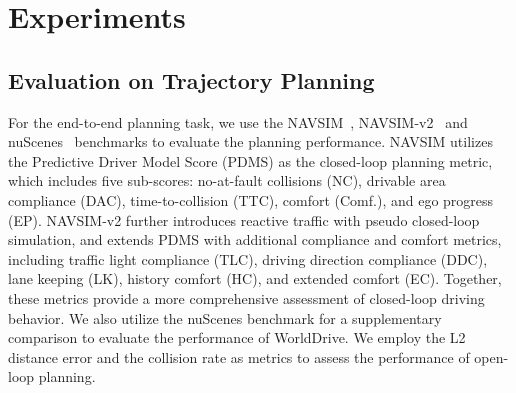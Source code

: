 \begin{table}[ht] 
        \centering
        
        \setlength{\tabcolsep}{6pt}
\caption{\textbf{nuScenes validation split open-loop planning comparison}.~We follow the SparseDrive evaluation metric. V: multi-view camera; SV: single-view camera}
\label{tab:openloop_turn}
\end{table}

\section{Experiments}


\subsection{Evaluation on Trajectory Planning}
For the end-to-end planning task, we use the NAVSIM~\cite{navsim}, NAVSIM-v2~\cite{cao2025pseudo} and nuScenes~\cite{nuscenes} benchmarks to evaluate the planning performance. NAVSIM utilizes the Predictive Driver Model Score (PDMS) as the closed-loop planning metric, which includes five sub-scores: no-at-fault collisions (NC), drivable area compliance (DAC), time-to-collision (TTC), comfort (Comf.), and ego progress (EP). NAVSIM-v2 further introduces reactive traffic with pseudo closed-loop simulation, and extends PDMS with additional compliance and comfort metrics, including traffic light compliance (TLC), driving direction compliance (DDC), lane keeping (LK), history comfort (HC), and extended comfort (EC). Together, these metrics provide a more comprehensive assessment of closed-loop driving behavior. We also utilize the nuScenes benchmark for a supplementary comparison to evaluate the performance of WorldDrive. We employ the L2 distance error and the collision rate as metrics to assess the performance of open-loop planning.

